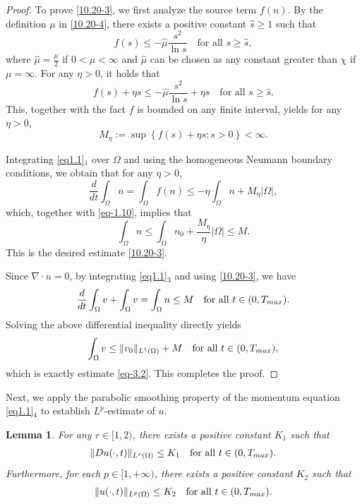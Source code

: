\documentclass[10pt,a4paper]{amsart}
\numberwithin{equation}{section}
\newtheorem{lemma}[theo]{Lemma}
\begin{document}
\begin{proof} 
To prove \eqref{10.20-3}, we first analyze the source term $f(n)$. By the definition 
$\mu$ in \eqref{10.20-4}, there exists a positive
constant \( \hat{s} \geq 1 \) such that
\begin{equation}\label{eq-3.3}
f(s) \leq - \hat{\mu} \frac{s^2}{\ln s} \quad \text{for all } s \geq \hat{s},
\end{equation}
where $\hat{\mu}  = \frac{\mu}{2}$ if $0 < \mu < \infty$ and $\hat{\mu}$  
can be chosen as any constant greater than $\chi$ if $\mu=\infty$.
For any $\eta>0$, it holds that
\begin{equation}\label{eq3.4}
f(s) + \eta s \leq -\hat{\mu} \frac{s^2}{\ln s} + \eta s \quad 
\text{for all } s \geq \hat{s}.
\end{equation}
This, together with the fact  $f$ is bounded on any finite interval, 
yields for any $\eta>0$,
\[
M_\eta :=  \sup\left\{ f(s) + \eta s : s > 0 \right\} < \infty.
\]

Integrating \eqref{eq1.1}$_1$ over $\Omega$ and using the homogeneous Neumann 
boundary conditions, we obtain that for any $\eta > 0$,
\begin{equation}\label{eq-3.5}
\frac{d}{dt} \int_{\Omega} n = \int_{\Omega} f(n) \leq -\eta \int_{\Omega} n + M_\eta |\Omega|,
\end{equation}
which, together with \eqref{eq-1.10}, implies that
\[
\int_{\Omega} n \leq \int_{\Omega} n_0 + \frac{M_\eta}{\eta} |\Omega| \leq M.
\]
This is the desired estimate \eqref{10.20-3}.

Since $\nabla\cdot u = 0$, by integrating \eqref{eq1.1}$_3$ and using \eqref{10.20-3}, 
we have
\[
\frac{d}{dt}\int_{\Omega} v + \int_{\Omega} v 
= \int_{\Omega} n \leq M \quad \text{for all } t \in (0, T_{\rm max}).
\]
Solving the above differential inequality directly yields
\[
\int_{\Omega} v \leq \|v_0\|_{L^1(\Omega)}+M\quad \text{for all } 
t \in (0, T_{\rm max}),
\]
which is exactly estimate \eqref{eq-3.2}. 
This completes the proof.
\end{proof}

Next, we apply the parabolic smoothing property of the momentum equation 
\eqref{eq1.1}$_4$ to establish $L^p$-estimate of $u$.

\begin{lemma}\label{lm3.2}
For any $ r \in [1, 2) $, there exists a positive constant $K_1$ such that
\begin{align}\label{10.20-1}
\| Du (\cdot, t) \|_{L^r(\Omega)} \leq K_1
\quad \text{for all } t \in (0, T_{\rm max}).
\end{align}
Furthermore, for each $p\in [1,+\infty)$, there exists a positive constant $K_2$ 
such that
\begin{equation}\label{eq3.6}
\|u(\cdot, t)\|_{L^p(\Omega)} \leq K_2 \quad \text{for all } t \in (0, T_{\rm max}).
\end{equation}
\end{lemma}
\end{document}
